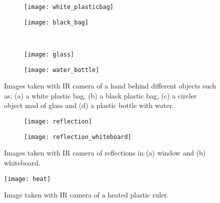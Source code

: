 \begin{figure}[h]
	\centering
	\begin{subfigure}[b]{0.4\textwidth}
		\texttt{[image: white\_plasticbag]}
		\caption{}
		\label{fig:whiteBag}
	\end{subfigure}
	\begin{subfigure}[b]{0.4\textwidth}
		\texttt{[image: black\_bag]}
		\caption{}
		\label{fig:blackBag}
	\end{subfigure}
	\\
	\begin{subfigure}[b]{0.4\textwidth}
		\texttt{[image: glass]}
		\caption{}
		\label{fig:glass}
	\end{subfigure}
	\begin{subfigure}[b]{0.4\textwidth}
		\texttt{[image: water\_bottle]}
		\caption{}
		\label{fig:waterBottle}
	\end{subfigure}
	\caption{Images taken with IR camera of a hand behind different objects such as, (a) a white plastic bag, (b) a black plastic bag, (c) a circler object mad of glass and (d) a plastic bottle with water.}
	\label{fig:hand}
\end{figure}
\begin{figure}
	\centering
	\begin{subfigure}[b]{0.4\textwidth}
		\texttt{[image: reflection]}
		\caption{}
		\label{fig:refWin}
	\end{subfigure}
	\begin{subfigure}[b]{0.4\textwidth}
		\texttt{[image: reflection\_whiteboard]}
		\caption{}
		\label{fig:refWB}
	\end{subfigure}
	\caption{Images taken with IR camera of reflections in (a) window and (b) whiteboard.}
	\label{fig:ref}
\end{figure}
\begin{figure}
	\centering
	\texttt{[image: heat]}
	\caption{Image taken with IR camera of a heated plastic ruler.}
	\label{fig:heat}
\end{figure}